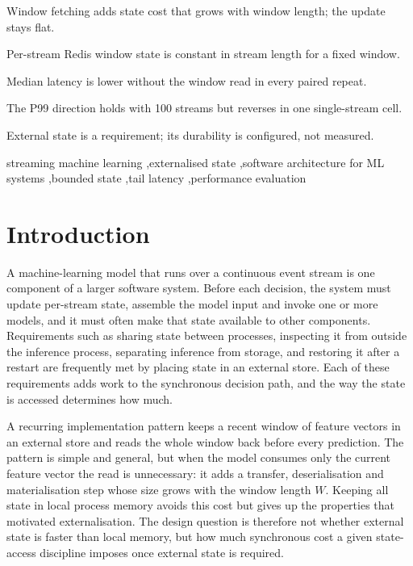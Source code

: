 \documentclass[a4paper,fleqn]{cas-dc}
\begin{document}
\begin{highlights}
\item Window fetching adds state cost that grows with window length; the update stays flat.
\item Per-stream Redis window state is constant in stream length for a fixed window.
\item Median latency is lower without the window read in every paired repeat.
\item The P99 direction holds with 100 streams but reverses in one single-stream cell.
\item External state is a requirement; its durability is configured, not measured.
\end{highlights}

\begin{keywords}
streaming machine learning \sep externalised state \sep software architecture for ML systems \sep bounded state \sep tail latency \sep performance evaluation
\end{keywords}

\maketitle

\section{Introduction}
\label{sec:intro}
A machine-learning model that runs over a continuous event stream is one component of a larger software system. Before each decision, the system must update per-stream state, assemble the model input and invoke one or more models, and it must often make that state available to other components. Requirements such as sharing state between processes, inspecting it from outside the inference process, separating inference from storage, and restoring it after a restart are frequently met by placing state in an external store. Each of these requirements adds work to the synchronous decision path, and the way the state is accessed determines how much.

A recurring implementation pattern keeps a recent window of feature vectors in an external store and reads the whole window back before every prediction. The pattern is simple and general, but when the model consumes only the current feature vector the read is unnecessary: it adds a transfer, deserialisation and materialisation step whose size grows with the window length $W$. Keeping all state in local process memory avoids this cost but gives up the properties that motivated externalisation. The design question is therefore not whether external state is faster than local memory, but how much synchronous cost a given state-access discipline imposes once external state is required.
\end{document}

